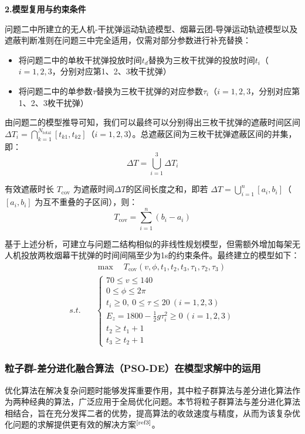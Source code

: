 \documentclass[withoutpreface]{cumcmthesis}
\begin{document}
\textbf{2.模型复用与约束条件}

问题二中所建立的无人机-干扰弹运动轨迹模型、烟幕云团-导弹运动轨迹模型以及遮蔽判断准则在问题三中完全适用，仅需对部分参数进行补充替换：
\begin{itemize}
    \item 将问题二中的单枚干扰弹投放时间\( t_d \)替换为三枚干扰弹的投放时间\( t_i \)（\( i=1,2,3 \)，分别对应第1、2、3枚干扰弹）
    \item 将问题二中的单参数\( \tau \)替换为三枚干扰弹的对应参数$\tau_i$（\( i=1,2,3 \)，分别对应第1、2、3枚干扰弹）
\end{itemize} 

由问题二的模型推导可知，我们可以最终可以分别得出三枚干扰弹的遮蔽时间区间\(\Delta  T_i=\bigcap_{k=1}^{N_{\text{total}}} [t_{k1}, t_{k2}]\)（\( i=1,2,3 \)）。总遮蔽区间为三枚干扰弹遮蔽区间的并集，即：
\begin{equation}
    \Delta T= \bigcup _{i=1}^3\Delta T_i
\end{equation}

有效遮蔽时长 $T_{\text{cov}}$ 为遮蔽时间$\Delta T$的区间长度之和，即若 $\Delta T = \bigcup_{i=1}^{n} [a_i, b_i]$（$[a_i, b_i]$ 为互不重叠的子区间），则：
\begin{equation}
    T_{\text{cov}} = \sum_{i=1}^{n} (b_i - a_i)
\end{equation}

基于上述分析，可建立与问题二结构相似的非线性规划模型，但需额外增加每架无人机投放两枚烟幕干扰弹的时间间隔至少为1s的约束条件。最终建立的模型如下：
\begin{equation}
\begin{aligned}
& \max \quad T_{\text{cov}}(v, \phi, t_1,t_2,t_3, \tau_1,\tau_2,\tau_3)  \\
s.t.\quad &\begin{cases}
70 \leq v \leq 140 \\
0 \leq \phi \leq 2\pi \\
t_i \geq 0,\ 0\leq \tau \leq 20 \ (i=1,2,3) \\
E_z = 1800 - \frac{1}{2} g \tau_i^2 \geq 0\ (i=1,2,3)\\
t_2 \geq t_1+1 \\
t_3 \geq t_2+1
\end{cases}
\end{aligned}
\end{equation}


\subsubsection{粒子群-差分进化融合算法（PSO-DE）在模型求解中的运用}
优化算法在解决复杂问题时能够发挥重要作用，其中粒子群算法与差分进化算法作为两种经典的算法，广泛应用于全局优化问题。本节将粒子群算法与差分进化算法相结合，旨在充分发挥二者的优势，提高算法的收敛速度与精度，从而为该复杂优化问题的求解提供更有效的解决方案$^\text{\cite{ref3}}$。
\end{document}
